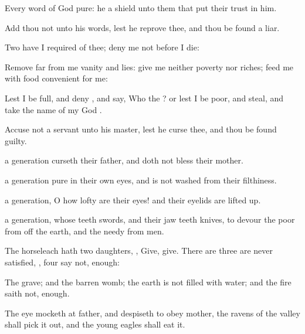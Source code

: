 {Every
word of
God
{}
pure: he
{} a
shield unto them that put their
trust in him.

Add thou not unto his
words, lest he
reprove thee, and thou be found a
liar.


\par }{\PP {}Two
{} have I
required of thee;
deny me
{} not before I
die:

Remove
far from me
vanity and
lies:
give me neither
poverty nor
riches;
feed me with
food
convenient for me:

Lest I be
full, and
deny
{}, and
say, Who
{} the
{}? or lest I be
poor, and
steal, and
take the
name of my
God
{}.


\par }{\PP {}Accuse not a
servant unto his
master, lest he
curse thee, and thou be found
guilty.

 a
generation
{}
curseth their
father, and doth not
bless their
mother.

 a
generation
{}
pure in their own
eyes, and
{} is not
washed from their
filthiness.

 a
generation, O how
lofty are their
eyes! and their
eyelids are lifted
up.

 a
generation, whose
teeth
{}
swords, and their jaw
teeth
{}
knives, to
devour the
poor from off the
earth, and the
needy from
{}
men.


\par }{\PP {}The
horseleach hath
two
daughters,
{},
Give,
give. There are
three
{} are never
satisfied,
{},
four
{}
say not,
{}
enough:

The
grave; and the
barren
womb; the
earth
{} is not
filled with
water; and the
fire
{}
saith not,
{}
enough.

The
eye
{}
mocketh at
{}
father, and
despiseth to
obey
{}
mother, the
ravens of the
valley shall pick it
out, and the
young
eagles shall
eat it.


}
